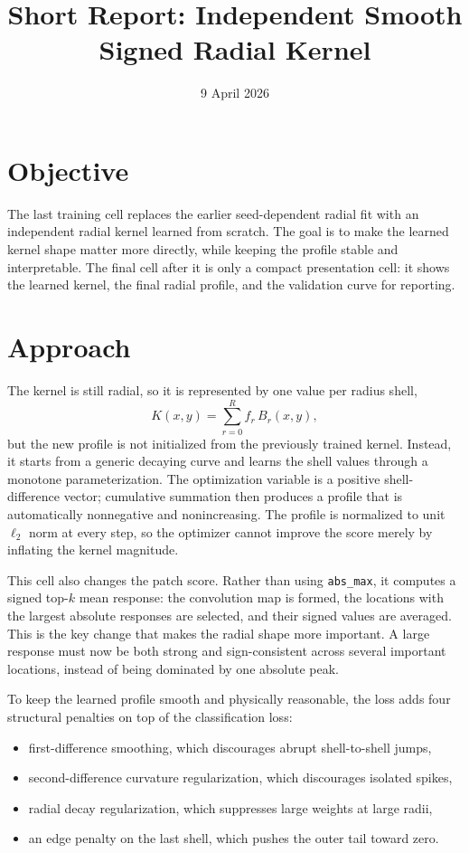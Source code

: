 \documentclass{article}
\begin{document}
\title{Short Report: Independent Smooth Signed Radial Kernel}
\author{}
\date{9 April 2026}
\maketitle
\footnotesize
\setlength{\parindent}{0pt}
\setlength{\parskip}{0.35em}

\section*{Objective}

The last training cell replaces the earlier seed-dependent radial fit with an independent radial kernel learned from scratch. The goal is to make the learned kernel shape matter more directly, while keeping the profile stable and interpretable. The final cell after it is only a compact presentation cell: it shows the learned kernel, the final radial profile, and the validation curve for reporting.

\section*{Approach}

The kernel is still radial, so it is represented by one value per radius shell,
\[
K(x,y)=\sum_{r=0}^{R} f_r\,B_r(x,y),
\]
but the new profile is not initialized from the previously trained kernel. Instead, it starts from a generic decaying curve and learns the shell values through a monotone parameterization. The optimization variable is a positive shell-difference vector; cumulative summation then produces a profile that is automatically nonnegative and nonincreasing. The profile is normalized to unit \(\ell_2\) norm at every step, so the optimizer cannot improve the score merely by inflating the kernel magnitude.

This cell also changes the patch score. Rather than using \texttt{abs\_max}, it computes a signed top-\(k\) mean response: the convolution map is formed, the locations with the largest absolute responses are selected, and their signed values are averaged. This is the key change that makes the radial shape more important. A large response must now be both strong and sign-consistent across several important locations, instead of being dominated by one absolute peak.

To keep the learned profile smooth and physically reasonable, the loss adds four structural penalties on top of the classification loss:
\begin{itemize}
    \item first-difference smoothing, which discourages abrupt shell-to-shell jumps,
    \item second-difference curvature regularization, which discourages isolated spikes,
    \item radial decay regularization, which suppresses large weights at large radii,
    \item an edge penalty on the last shell, which pushes the outer tail toward zero.
\end{itemize}
\end{document}
